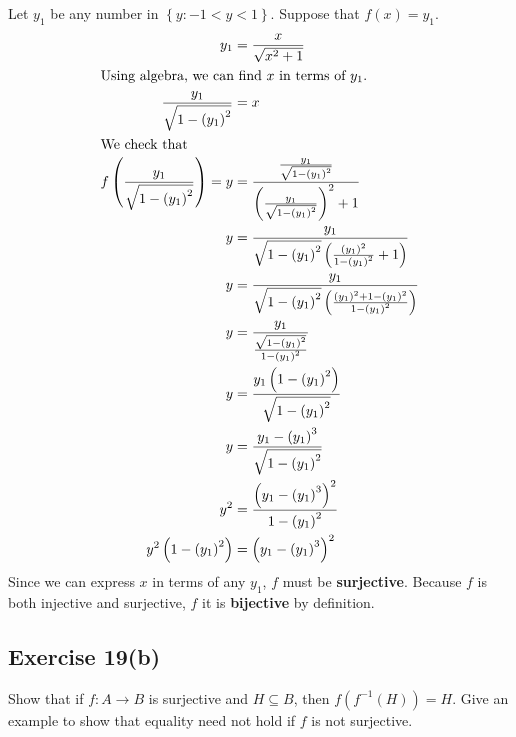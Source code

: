\documentclass[12pt]{article}
\begin{document}
\begin{flushleft}
Let $y_1$ be any number in $\left\{y : -1 < y < 1\right\}$. Suppose that $f(x) = y_1$.
\begin{align*}
y_1 &= \frac{x}{\sqrt{x^2 + 1}} \\
\intertext{Using algebra, we can find $x$ in terms of $y_1$.}
\frac{y_1}{\sqrt{1 - \left(y_1\right)^2}} &= x \\
\intertext{We check that }
f\left(\frac{y_1}{\sqrt{1 - \left(y_1\right)^2}}\right) = y &= \frac{\frac{y_1}{\sqrt{1 - \left(y_1\right)^2}}}{\left(\frac{y_1}{\sqrt{1 - \left(y_1\right)^2}}\right)^2 + 1} \\
y &= \frac{y_1}{\sqrt{1 - \left(y_1\right)^2}\left(\frac{\left(y_1\right)^2}{1 - \left(y_1\right)^2} + 1\right)} \\
y &= \frac{y_1}{\sqrt{1 - \left(y_1\right)^2}\left(\frac{\left(y_1\right)^2 + 1 - \left(y_1\right)^2}{1 - \left(y_1\right)^2}\right)} \\
y &= \frac{y_1}{\frac{\sqrt{1 - \left(y_1\right)^2}}{1 - \left(y_1\right)^2}} \\
y &= \frac{y_1\left(1 - \left(y_1\right)^2\right)}{\sqrt{1 - \left(y_1\right)^2}} \\
y &= \frac{y_1 - \left(y_1\right)^3}{\sqrt{1 - \left(y_1\right)^2}} \\
y^2 &= \frac{\left(y_1 - \left(y_1\right)^3\right)^2}{1 - \left(y_1\right)^2} \\
y^2\left(1 - \left(y_1\right)^2\right) &= \left(y_1 - \left(y_1\right)^3\right)^2 \\
\end{align*}
Since we can express $x$ in terms of any $y_1$, $f$ must be \textbf{surjective}. Because $f$ is both injective and surjective, $f$ it is \textbf{bijective} by definition.

\subsection*{Exercise 19(b)}
Show that if $f : A \rightarrow B$ is surjective and $H \subseteq B$, then $f\left(f^{-1}\left(H\right)\right) = H$. Give an example to show that equality need not hold if $f$ is not surjective.

\end{flushleft}
\end{document}
